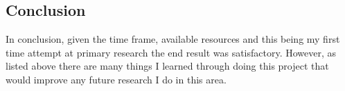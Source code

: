 \documentclass[journal]{IEEEtran}
\begin{document}
	
	\subsection{Conclusion}
	In conclusion, given the time frame, available resources and this being my first time attempt at primary research the end result was satisfactory. However, as listed above there are many things I learned through doing this project that would improve any future research I do in this area.
\end{document}
